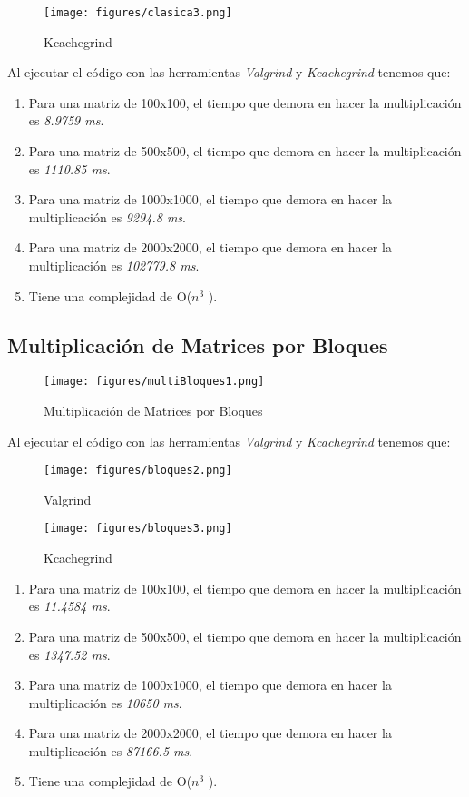 \documentclass[paper=a4, fontsize=11pt]{scrartcl}
\numberwithin{equation}{section}		%
\numberwithin{figure}{section}			%
\numberwithin{table}{section}				%
\begin{document}
\begin{figure}[!h]
  \centering
  \texttt{[image: figures/clasica3.png]}
  \caption{Kcachegrind}
  \label{fig:3}
\end{figure}

Al ejecutar el código con las herramientas \textit{Valgrind} y \textit{Kcachegrind} tenemos que:
\begin{enumerate}
    \item Para una matriz de 100x100, el tiempo que demora en hacer la multiplicación es \textit{8.9759 ms}.
    \item Para una matriz de 500x500, el tiempo que demora en hacer la multiplicación es \textit{1110.85 ms}.
    \item Para una matriz de 1000x1000, el tiempo que demora en hacer la multiplicación es \textit{9294.8 ms}.
    \item Para una matriz de 2000x2000, el tiempo que demora en hacer la multiplicación es \textit{102779.8 ms}.
    \item Tiene una complejidad de O($n^3$\hspace{-1mm} ).
\end{enumerate}

\subsection{Multiplicación de Matrices por Bloques}

\begin{figure}[!h]
  \centering
  \texttt{[image: figures/multiBloques1.png]}
  \caption{Multiplicación de Matrices por Bloques}
  \label{fig:4}
\end{figure}

Al ejecutar el código con las herramientas \textit{Valgrind} y \textit{Kcachegrind} tenemos que:
\begin{figure}[!h]
  \centering
  \texttt{[image: figures/bloques2.png]}
  \caption{Valgrind}
  \label{fig:5}
\end{figure}

\begin{figure}[!h]
  \centering
  \texttt{[image: figures/bloques3.png]}
  \caption{Kcachegrind}
  \label{fig:6}
\end{figure}

\begin{enumerate}
    \item Para una matriz de 100x100, el tiempo que demora en hacer la multiplicación es \textit{11.4584 ms}.
    \item Para una matriz de 500x500, el tiempo que demora en hacer la multiplicación es \textit{1347.52 ms}.
    \item Para una matriz de 1000x1000, el tiempo que demora en hacer la multiplicación es \textit{10650 ms}.
    \item Para una matriz de 2000x2000, el tiempo que demora en hacer la multiplicación es \textit{87166.5 ms}.
    \item Tiene una complejidad de O($n^3$\hspace{-1mm} ).
\end{enumerate}
\end{document}
